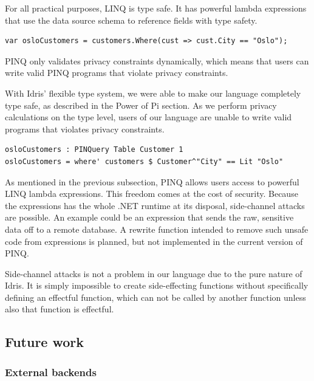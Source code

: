 \documentclass[12pt]{article}
\begin{document}
{For all practical purposes, LINQ is type safe.
It has powerful lambda expressions that use the data source schema to reference fields with type safety.

\begin{lstlisting}[caption = LINQ where query, captionpos=b]
var osloCustomers = customers.Where(cust => cust.City == "Oslo"); 
\end{lstlisting}

PINQ only validates privacy constraints dynamically, which means that users can write valid PINQ programs that violate privacy constraints.

With Idris' flexible type system, we were able to make our language completely type safe, as described in the Power of Pi section.
As we perform privacy calculations on the type level, users of our language are unable to write valid programs that violates privacy constraints.

\begin{lstlisting}[caption = LANGUAGE NAME where query, captionpos=b]
osloCustomers : PINQuery Table Customer 1
osloCustomers = where' customers $ Customer^"City" == Lit "Oslo"
\end{lstlisting}

As mentioned in the previous subsection, PINQ allows users access to powerful LINQ lambda expressions.
This freedom comes at the cost of security.
Because the expressions has the whole .NET runtime at its disposal, side-channel attacks are possible.
An example could be an expression that sends the raw, sensitive data off to a remote database.
A rewrite function intended to remove such unsafe code from expressions is planned, but not implemented in the current version of PINQ.

Side-channel attacks is not a problem in our language due to the pure nature of Idris.
It is simply impossible to create side-effecting functions without specifically defining an effectful function, which can not be called by another function unless also that function is effectful.

\subsection{Future work}\label{sec:future_work}

\subsubsection{External backends}

}
\end{document}
